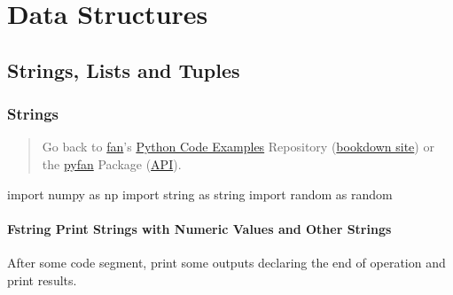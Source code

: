 \documentclass[
]{book}
\newenvironment{Shaded}{\begin{snugshade}}{\end{snugshade}}
\newcommand{\ImportTok}[1]{#1}
\newcommand{\NormalTok}[1]{#1}
\begin{document}
\hypertarget{data-structures}{%
\chapter{Data Structures}\label{data-structures}}

\hypertarget{strings-lists-and-tuples}{%
\section{Strings, Lists and Tuples}\label{strings-lists-and-tuples}}

\hypertarget{strings}{%
\subsection{Strings}\label{strings}}

\begin{quote}
Go back to \href{http://fanwangecon.github.io/}{fan}'s \href{https://fanwangecon.github.io/Py4Econ/}{Python Code Examples} Repository (\href{https://fanwangecon.github.io/Py4Econ/bookdown}{bookdown site}) or the \href{https://pyfan.readthedocs.io/en/latest/}{pyfan} Package (\href{https://pyfan.readthedocs.io/en/latest/reference.html}{API}).
\end{quote}

\begin{Shaded}
\begin{Highlighting}[]
\ImportTok{import}\NormalTok{ numpy }\ImportTok{as}\NormalTok{ np}
\ImportTok{import}\NormalTok{ string }\ImportTok{as}\NormalTok{ string}
\ImportTok{import}\NormalTok{ random }\ImportTok{as}\NormalTok{ random}
\end{Highlighting}
\end{Shaded}

\hypertarget{fstring-print-strings-with-numeric-values-and-other-strings}{%
\subsubsection{Fstring Print Strings with Numeric Values and Other Strings}\label{fstring-print-strings-with-numeric-values-and-other-strings}}

After some code segment, print some outputs declaring the end of operation and print results.
\end{document}
